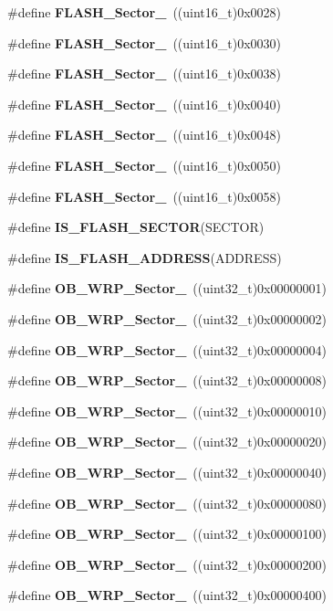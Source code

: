 \begin{DoxyCompactItemize}
\#define \textbf{ F\+L\+A\+S\+H\+\_\+\+Sector\+\_}~((uint16\+\_\+t)0x0028)
\item 
\#define \textbf{ F\+L\+A\+S\+H\+\_\+\+Sector\+\_}~((uint16\+\_\+t)0x0030)
\item 
\#define \textbf{ F\+L\+A\+S\+H\+\_\+\+Sector\+\_}~((uint16\+\_\+t)0x0038)
\item 
\#define \textbf{ F\+L\+A\+S\+H\+\_\+\+Sector\+\_}~((uint16\+\_\+t)0x0040)
\item 
\#define \textbf{ F\+L\+A\+S\+H\+\_\+\+Sector\+\_}~((uint16\+\_\+t)0x0048)
\item 
\#define \textbf{ F\+L\+A\+S\+H\+\_\+\+Sector\+\_}~((uint16\+\_\+t)0x0050)
\item 
\#define \textbf{ F\+L\+A\+S\+H\+\_\+\+Sector\+\_}~((uint16\+\_\+t)0x0058)
\item 
\#define \textbf{ I\+S\+\_\+\+F\+L\+A\+S\+H\+\_\+\+S\+E\+C\+T\+OR}(S\+E\+C\+T\+OR)
\item 
\#define \textbf{ I\+S\+\_\+\+F\+L\+A\+S\+H\+\_\+\+A\+D\+D\+R\+E\+SS}(A\+D\+D\+R\+E\+SS)
\item 
\#define \textbf{ O\+B\+\_\+\+W\+R\+P\+\_\+\+Sector\+\_}~((uint32\+\_\+t)0x00000001)
\item 
\#define \textbf{ O\+B\+\_\+\+W\+R\+P\+\_\+\+Sector\+\_}~((uint32\+\_\+t)0x00000002)
\item 
\#define \textbf{ O\+B\+\_\+\+W\+R\+P\+\_\+\+Sector\+\_}~((uint32\+\_\+t)0x00000004)
\item 
\#define \textbf{ O\+B\+\_\+\+W\+R\+P\+\_\+\+Sector\+\_}~((uint32\+\_\+t)0x00000008)
\item 
\#define \textbf{ O\+B\+\_\+\+W\+R\+P\+\_\+\+Sector\+\_}~((uint32\+\_\+t)0x00000010)
\item 
\#define \textbf{ O\+B\+\_\+\+W\+R\+P\+\_\+\+Sector\+\_}~((uint32\+\_\+t)0x00000020)
\item 
\#define \textbf{ O\+B\+\_\+\+W\+R\+P\+\_\+\+Sector\+\_}~((uint32\+\_\+t)0x00000040)
\item 
\#define \textbf{ O\+B\+\_\+\+W\+R\+P\+\_\+\+Sector\+\_}~((uint32\+\_\+t)0x00000080)
\item 
\#define \textbf{ O\+B\+\_\+\+W\+R\+P\+\_\+\+Sector\+\_}~((uint32\+\_\+t)0x00000100)
\item 
\#define \textbf{ O\+B\+\_\+\+W\+R\+P\+\_\+\+Sector\+\_}~((uint32\+\_\+t)0x00000200)
\item 
\#define \textbf{ O\+B\+\_\+\+W\+R\+P\+\_\+\+Sector\+\_}~((uint32\+\_\+t)0x00000400)
\item 

\end{DoxyCompactItemize}
